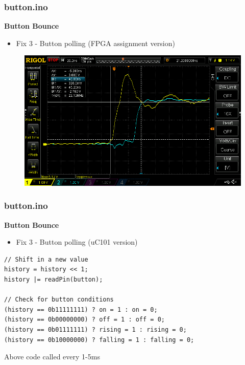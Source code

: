 \documentclass[t]{beamer}
\begin{document}
\begin{frame}[t]
\frametitle{button.ino}
\textbf{Button Bounce}
\begin{itemize}
	\item Fix 3 - Button polling (FPGA assignment version)
\end{itemize}
\begin{figure}
	\includegraphics[scale=0.3]{riseDelay.png}
\end{figure}
\end{frame}


\begin{frame}[t,fragile]
\frametitle{button.ino}
\textbf{Button Bounce}
\begin{itemize}
	\item Fix 3 - Button polling (uC101 version)
\end{itemize}
\begin{verbatim}
// Shift in a new value
history = history << 1;
history |= readPin(button);

// Check for button conditions
(history == 0b11111111) ? on = 1 : on = 0;
(history == 0b00000000) ? off = 1 : off = 0;
(history == 0b01111111) ? rising = 1 : rising = 0;
(history == 0b10000000) ? falling = 1 : falling = 0;
\end{verbatim}
Above code called every 1-5ms

\end{frame}

\end{document}
